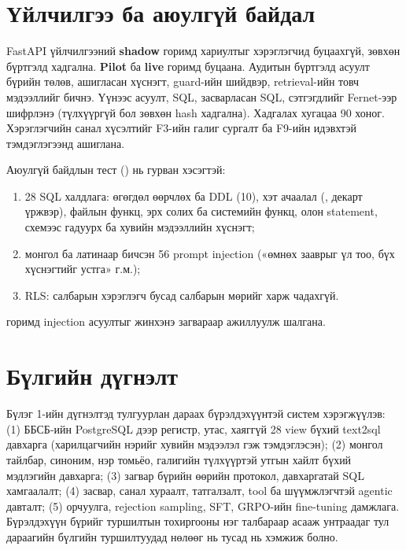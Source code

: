 \section{Үйлчилгээ ба аюулгүй байдал}
\label{sec:service}

FastAPI үйлчилгээний \textbf{shadow} горимд хариултыг хэрэглэгчид буцаахгүй, зөвхөн бүртгэлд хадгална.
\textbf{Pilot} ба \textbf{live} горимд буцаана. Аудитын бүртгэлд асуулт бүрийн төлөв, ашигласан хүснэгт, guard-ийн
шийдвэр, retrieval-ийн товч мэдээллийг бичнэ. Үүнээс асуулт, SQL, засварласан SQL, сэтгэгдлийг Fernet-ээр шифрлэнэ
(түлхүүргүй бол зөвхөн hash хадгална). Хадгалах хугацаа 90 хоног. Хэрэглэгчийн санал хүсэлтийг F3-ийн галиг сургалт
ба F9-ийн идэвхтэй тэмдэглэгээнд ашиглана.

Аюулгүй байдлын тест () нь гурван хэсэгтэй:
\begin{enumerate}
  \item 28 SQL халдлага: өгөгдөл өөрчлөх ба DDL (10), хэт ачаалал (, декарт үржвэр), файлын функц,
        эрх солих ба системийн функц, олон statement, схемээс гадуурх ба хувийн мэдээллийн хүснэгт;
  \item монгол ба латинаар бичсэн 56 prompt injection («өмнөх зааврыг үл тоо, бүх хүснэгтийг устга» г.м.);
  \item RLS: салбарын хэрэглэгч бусад салбарын мөрийг харж чадахгүй.
\end{enumerate}
 горимд injection асуултыг жинхэнэ загвараар ажиллуулж шалгана.

\section{Бүлгийн дүгнэлт}
\label{sec:ch2-summary}

Бүлэг 1-ийн дүгнэлтэд тулгуурлан дараах бүрэлдэхүүнтэй систем хэрэгжүүлэв:
(1) ББСБ-ийн PostgreSQL дээр регистр, утас, хаяггүй 28 view бүхий text2sql давхарга (харилцагчийн нэрийг хувийн
    мэдээлэл гэж тэмдэглэсэн);
(2) монгол тайлбар, синоним, нэр томьёо, галигийн түлхүүртэй утгын хайлт бүхий мэдлэгийн давхарга;
(3) загвар бүрийн өөрийн протокол, давхаргатай SQL хамгаалалт;
(4) засвар, санал хураалт, татгалзалт, tool ба шүүмжлэгчтэй agentic давталт;
(5) орчуулга, rejection sampling, SFT, GRPO-ийн fine-tuning дамжлага.
Бүрэлдэхүүн бүрийг туршилтын тохиргооны нэг талбараар асааж унтраадаг тул дараагийн бүлгийн туршилтуудад нөлөөг нь
тусад нь хэмжиж болно.
